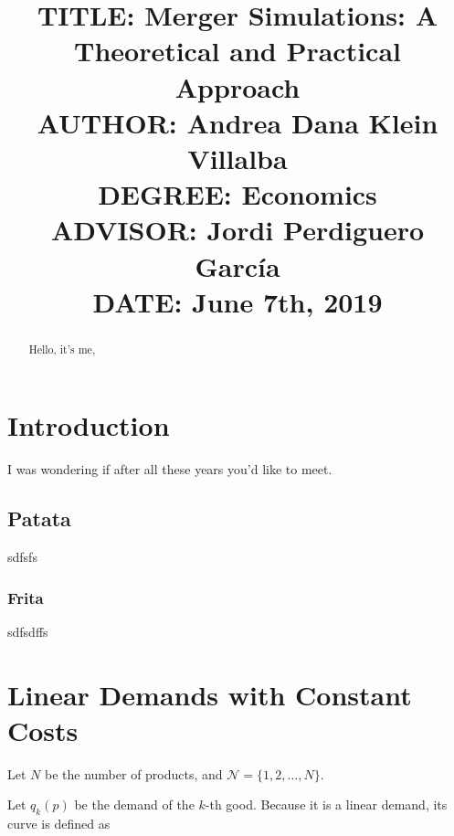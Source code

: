 \documentclass[12pt]{article}
\begin{document}

\title{{\large TITLE: Merger Simulations: A Theoretical and Practical Approach\\
AUTHOR: Andrea Dana Klein Villalba\\
DEGREE: Economics\\
ADVISOR: Jordi Perdiguero Garc\'ia\\
DATE: June 7th, 2019\\}}
\date{}

\clearpage\maketitle
\thispagestyle{empty}
\newpage

\begin{abstract}
Hello, it's me,
\end{abstract}
\newpage

 \tableofcontents
 \newpage

\section{Introduction}
I was wondering if after all these years you'd like to meet.

\subsection{Patata}
sdfsfs

\subsubsection{Frita}
sdfsdffs

\section{Linear Demands with Constant Costs}
Let $N$ be the number of products, and $\mathcal{N} = \{1, 2, \dots, N\}$.

Let $q_k (p)$ be the demand of the $k$-th good. Because it is a linear demand, its curve is defined as
\end{document}
